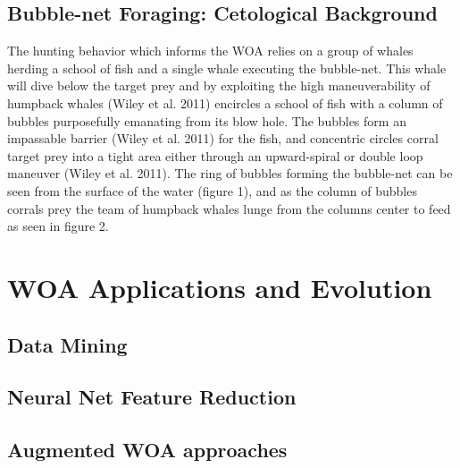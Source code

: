 \documentclass[11pt]{article}
\begin{document}
\subsection*{Bubble-net Foraging: Cetological Background}
The hunting behavior which informs the WOA relies on a group of whales herding a school of fish and a single whale executing the bubble-net.
This whale will dive below the target prey and by exploiting the high maneuverability of humpback whales (Wiley et al. 2011) encircles a school of fish with a column of bubbles purposefully emanating from its blow hole.
The bubbles form an impassable barrier (Wiley et al. 2011) for the fish, and concentric circles corral target prey into a tight area either through an upward-spiral or double loop maneuver (Wiley et al. 2011).
The ring of bubbles forming the bubble-net can be seen from the surface of the water (figure 1), and as the column of bubbles corrals prey the team of humpback whales lunge from the columns center to feed as seen in figure 2.

\section*{WOA Applications and Evolution}
\subsection*{Data Mining}
\subsection*{Neural Net Feature Reduction}
\subsection*{Augmented WOA approaches}
\end{document}
